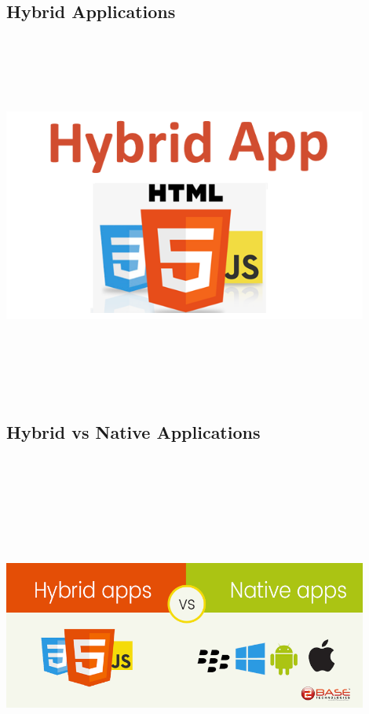 \subsection{Hybrid Applications}
\par
\medskip
\begin{center}
    \includegraphics[width=12cm,height=12cm,keepaspectratio]{Images/hybridapp.png}
\end{center}

\subsection{Hybrid vs Native Applications}
\par
\medskip
\begin{center}
    \includegraphics[width=12cm,height=12cm,keepaspectratio]{Images/hybridvnative.png}
\end{center}

